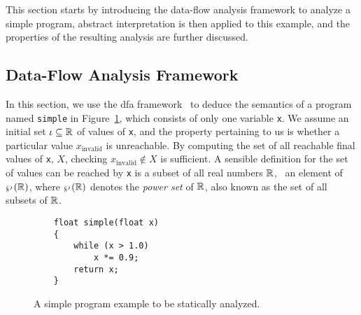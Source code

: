 This section starts by introducing the data-flow analysis framework to analyze
a simple program, abstract interpretation is then applied to this example, and
the properties of the resulting analysis are further discussed.


\subsection{Data-Flow Analysis Framework}
\label{bg:sub:data_flow}

In this section, we use the \gls{dfa} framework~\cite{nielson99} to deduce
the semantics of a program named \verb|simple| in Figure~\ref{bg:lst:simple},
which consists of only one variable \verb|x|.  We assume an initial
set $\iota \subseteq \mathbb{R}$ of values of \verb|x|, and the property
pertaining to us is whether a particular value $x_\mathrm{invalid}$ is
unreachable.  By computing the set of all reachable final values of \verb|x|,
$X$, checking $x_\mathrm{invalid} \notin X$ is sufficient.  A sensible
definition for the set of values can be reached by \verb|x| is a subset of
all real numbers $\mathbb{R}$, \ie~an element of $\wp\left({\mathbb{R}}\right)$, where
$\wp\left({\mathbb{R}}\right)$ denotes the \emph{power set} of $\mathbb{R}$, also known as
the set of all subsets of $\mathbb{R}$.
\begin{figure}[ht]
    \centering
    \begin{minipage}{0.5\textwidth}
    \begin{lstlisting}
    float simple(float x)
    {
        while (x > 1.0)
            x *= 0.9;
        return x;
    }
    \end{lstlisting}
    \end{minipage}
    \caption{%
        A simple program example to be statically analyzed.
    }\label{bg:lst:simple}
\end{figure}

